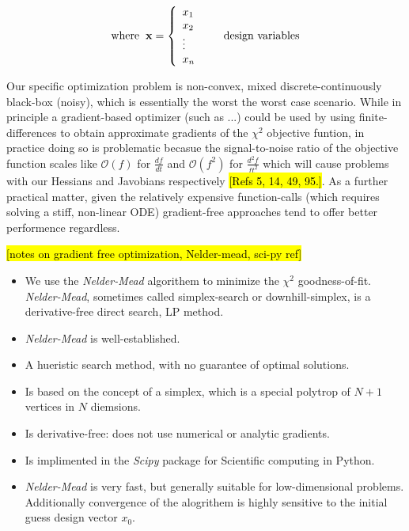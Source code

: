 \documentclass[10pt,a4paper]{article}
\begin{document}
\[ 
\begin{array}{ll}
\mbox{where} \hspace{2 mm} \mathbf{x} = \left\{ \begin{array}{ll}

x_1 & \\
x_2 & \\
\vdots &\\
x_n &
\end{array} \right. & \mbox{design variables}
\end{array}
\]

Our specific optimization problem is non-convex, mixed discrete-continuously black-box (noisy), which is essentially the worst the worst case scenario. While in principle a gradient-based optimizer (such as ...) could be used by using finite-differences to obtain approximate gradients of the $\chi^2$ objective funtion, in practice doing so is problematic becasue the signal-to-noise ratio of the objective function scales like $\mathcal{O}(f)$ for $\frac{df}{dt}$ and $\mathcal{O}(f^2)$ for $\frac{d^2f}{ft^2}$ which will cause problems with our Hessians and Javobians respectively \hl{[Refs 5, 14, 49, 95.]}. As a further practical matter, given the relatively expensive function-calls (which requires solving a stiff, non-linear ODE) gradient-free approaches tend to offer better performence regardless. 

\hl{[notes on gradient free optimization, Nelder-mead, sci-py ref]}
\begin{itemize}
\item We use the \emph{Nelder-Mead} algorithem to minimize the $\chi^2$ goodness-of-fit. \emph{Nelder-Mead}, sometimes called simplex-search or downhill-simplex, is a derivative-free direct search, LP method.
\item \emph{Nelder-Mead} is well-established.
\item A hueristic search method, with no guarantee of optimal solutions.
\item Is based on the concept of a simplex, which is a special polytrop of $N + 1$ vertices in $N$ diemsions.
\item Is derivative-free: does not use numerical or analytic gradients.
\item Is implimented in the \emph{Scipy} package for Scientific computing in Python.
\item \emph{Nelder-Mead} is very fast, but generally suitable for low-dimensional problems. Additionally convergence of the alogrithem is highly sensitive to the initial guess design vector $x_0$.
\end{itemize}
\end{document}
